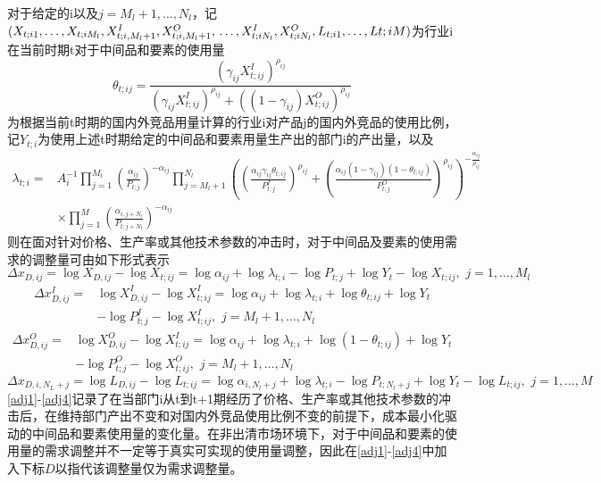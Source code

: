 \documentclass{article}
\begin{document}
对于给定的i以及$j=M_l+1,\dots,N_l$，记$(X_{t;i1},\dots,X_{t;iM_l},X_{t;i,M_l+1}^I,X_{t;i,M_l+1}^O,\\\dots,X_{t;iN_l}^I,X_{t;iN_l}^O,L_{t;i1},\dots,L{t;iM})$为行业i在当前时期t对于中间品和要素的使用量
\begin{equation}
\theta_{t;ij}=\frac{\left(\gamma_{ij}X_{t;ij}^I\right)^{\rho_{ij}}}{\left(\gamma_{ij}X_{t;ij}^I\right)^{\rho_{ij}}+\left((1-\gamma_{ij})X_{t;ij}^O\right)^{\rho_{ij}}}
\end{equation} 为根据当前t时期的国内外竞品用量计算的行业i对产品j的国内外竞品的使用比例，记$Y_{t;i}$为使用上述t时期给定的中间品和要素用量生产出的部门i的产出量，以及
\begin{equation}\label{lambda}
\begin{aligned}
\lambda_{t;i}=&A_i^{-1}\prod_{j=1}^{M_l}\left(\frac{\alpha_{ij}}{P_{t;j}}\right)^{-\alpha_{ij}}\prod_{j=M_l+1}^{N_l}\left(\left(\frac{\alpha_{ij}\gamma_{ij}\theta_{t;ij}}{P_{t;j}^I}\right)^{\rho_{ij}}+\left(\frac{\alpha_{ij}(1-\gamma_{ij})(1-\theta_{t;ij})}{P_{t;j}^O}\right)^{\rho_{ij}}\right)^{-\frac{\alpha_{ij}}{\rho_{ij}}}\\&\times\prod_{j=1}^{M}\left(\frac{\alpha_{i,j+N_l}}{P_{t;j+N_l}}\right)^{-\alpha_{ij}}
\end{aligned}
\end{equation}
则在面对针对价格、生产率或其他技术参数的冲击时，对于中间品及要素的使用需求的调整量可由如下形式表示
\begin{equation}\label{adj1}
    \Delta x_{D,ij}=\log X_{D,ij}-\log X_{t;ij}=\log \alpha_{ij}+\log \lambda_{t;i} -\log P_{t;j} +\log Y_t -\log X_{t;ij},\,\,j=1,\dots,M_l
\end{equation}
\begin{equation}\label{adj2}
\begin{aligned}
     \Delta x^I_{D,ij}=&\log X^I_{D,ij}-\log X^I_{t;ij}=\log \alpha_{ij}+\log \lambda_{t;i} +\log\theta_{t;ij}+\log Y_t
     \\&-\log P^I_{t;j}  -\log X^I_{t;ij},\,\,j=M_l+1,\dots,N_l
\end{aligned}
\end{equation}
\begin{equation}\label{adj3}
\begin{aligned}
      \Delta x^O_{D,ij}=&\log X^O_{D,ij}-\log X^I_{t;ij}=\log \alpha_{ij}+\log \lambda_{t;i} +\log(1-\theta_{t;ij})+\log Y_t\\&-\log P^O_{t;j}  -\log X^O_{t;ij},\,\,j=M_l+1,\dots,N_l
\end{aligned}
\end{equation} 
\begin{equation}\label{adj4}
    \Delta x_{D,i,N_L+j}=\log L_{D,ij}-\log L_{t;ij}=\log \alpha_{i,N_l+j}+\log \lambda_{t;i} -\log P_{t;N_l+j} +\log Y_t -\log L_{t;ij},\,\,j=1,\dots,M
\end{equation} \eqref{adj1}-\eqref{adj4}记录了在当部门i从t到t+1期经历了价格、生产率或其他技术参数的冲击后，在维持部门产出不变和对国内外竞品使用比例不变的前提下，成本最小化驱动的中间品和要素使用量的变化量。在非出清市场环境下，对于中间品和要素的使用量的需求调整并不一定等于真实可实现的使用量调整，因此在\eqref{adj1}-\eqref{adj4}中加入下标$D$以指代该调整量仅为需求调整量。
\end{document}
